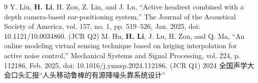 \documentclass{resume}
\begin{document}

\renewcommand{\refname}{个人成果}
\nocite{*}    %
% 
% 

\begin{thebibliography}{9}
 Y. Liu, \textbf{H. Li}, H. Zou, Z. Lin, and J. Lu, “Active headrest combined with a depth camera-based ear-positioning system,” The Journal of the Acoustical Society of America, vol. 157, no. 1, pp. 519–526, Jan. 2025, doi: 10.1121/10.0034860. (JCR Q2)
 M. Hu, \textbf{H. Li}, J. Lu, H. Zou, and Q. Ma, “An online modeling virtual sensing technique based on kriging interpolation for active noise control,” Mechanical Systems and Signal Processing, vol. 224, p. 112186, Feb. 2025, doi: 10.1016/j.ymssp.2024.112186. (JCR Q1)
 2024 全国声学大会口头汇报“人头移动鲁棒的有源降噪头靠系统设计”
\end{thebibliography}
\end{document}
